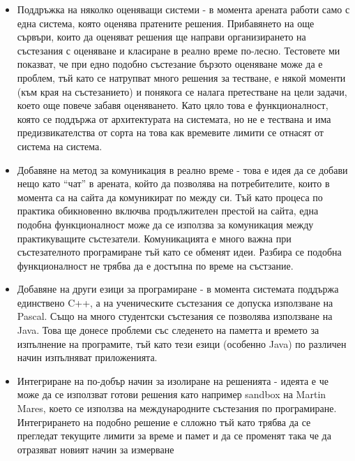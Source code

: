 \documentclass[a4paper,12pt]{article}
\begin{document}
    \begin{itemize}
      \item Поддръжка на няколко оценяващи системи - в момента арената работи само с една система, която оценява пратените решения. Прибавянето на още сървъри, които да оценяват решения ще направи организирането на състезания с оценяване и класиране в реално време по-лесно. Тестовете ми показват, че при едно подобно състезание бързото оценяване може да е проблем, тъй като се натрупват много решения за тестване, е някой моменти (към края на състезанието) и понякога се налага претестване на цели задачи, което още повече забавя оценяването. Като цяло това е функционалност, която се поддържа от архитектурата на системата, но не е тествана и има предизвикателства от сорта на това как времевите лимити се отнасят от система на система.
      \item Добавяне на метод за комуникация в реално време - това е идея да се добави нещо като ``чат'' в арената, който да позволява на потребителите, които в момента са на сайта да комуникират по между си. Тъй като процеса по практика обикновенно включва продължителен престой на сайта, една подобна функционалност може да се използва за комуникация между практикуващите състезатели. Комуникацията е много важна при състезателното програмиране тъй като се обменят идеи. Разбира се подобна функционалност не трябва да е достъпна по време на състзание.
      \item Добавяне на други езици за програмиране - в момента системата поддържа единствено C++, а на ученическите състезания се допуска използване на Pascal. Също на много студентски състезания се позволява използване на Java. Това ще донесе проблеми със следенето на паметта и времето за изпълнение на програмите, тъй като тези езици (особенно Java) по различен начин изпълняват приложенията.
      \item Интегриране на по-добър начин за изолиране на решенията - идеята е че може да се използват готови решения като например sandbox на Martin Mares, което се използва на международните състезания по програмиране. Интегрирането на подобно решение е слложно тъй като трябва да се прегледат текущите лимити за време и памет и да се променят така че да отразяват новият начин за измерване
    \end{itemize}
  
  \newpage
  
\end{document}
